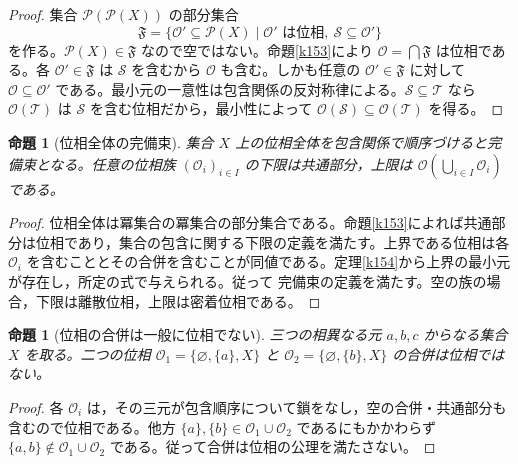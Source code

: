 \documentclass[a5paper,10pt,dvipdfmx]{jsarticle}
\theoremstyle{definition}
\theoremstyle{plain}
\newtheorem{prop}[ruledef]{命題}
\newcommand{\Pow}{\mathcal{P}}
\newcommand{\GenronRefText}[2]{#2}
\begin{document}
\begin{proof}
集合 $\Pow(\Pow(X))$ の部分集合
\[\mathfrak F=\{\mathcal{O}'\subseteq\Pow(X)\mid
 \mathcal{O}'\text{ は位相},\ \mathcal S\subseteq\mathcal{O}'\}\]
を作る。$\Pow(X)\in\mathfrak F$ なので空ではない。命題\ref{k153}により $\mathcal{O}=\bigcap\mathfrak F$ は位相である。各 $\mathcal{O}'\in\mathfrak F$ は $\mathcal S$ を含むから $\mathcal{O}$ も含む。しかも任意の $\mathcal{O}'\in\mathfrak F$ に対して $\mathcal{O}\subseteq\mathcal{O}'$ である。最小元の一意性は包含関係の反対称律による。$\mathcal S\subseteq\mathcal T$ なら $\mathcal{O}(\mathcal T)$ は $\mathcal S$ を含む位相だから，最小性によって $\mathcal{O}(\mathcal S)\subseteq\mathcal{O}(\mathcal T)$ を得る。
\end{proof}
\begin{prop}[位相全体の完備束]\label{k155}
集合 $X$ 上の位相全体を包含関係で順序づけると完備束となる。任意の位相族 $(\mathcal{O}_i)_{i\in I}$ の下限は共通部分，上限は $\mathcal{O}(\bigcup_{i\in I}\mathcal{O}_i)$ である。
\end{prop}
\begin{proof}
位相全体は冪集合の冪集合の部分集合である。命題\ref{k153}によれば共通部分は位相であり，集合の包含に関する下限の定義を満たす。上界である位相は各 $\mathcal{O}_i$ を含むこととその合併を含むことが同値である。定理\ref{k154}から上界の最小元が存在し，所定の式で与えられる。従って \GenronRefText{K-000085}{完備束の定義}を満たす。空の族の場合，下限は離散位相，上限は密着位相である。
\end{proof}
\begin{prop}[位相の合併は一般に位相でない]\label{k156}
三つの相異なる元 $a,b,c$ からなる集合 $X$ を取る。二つの位相 $\mathcal{O}_1=\{\varnothing,\{a\},X\}$ と $\mathcal{O}_2=\{\varnothing,\{b\},X\}$ の合併は位相ではない。
\end{prop}
\begin{proof}
各 $\mathcal{O}_i$ は，その三元が包含順序について鎖をなし，空の合併・共通部分も含むので位相である。他方 $\{a\},\{b\}\in\mathcal{O}_1\cup\mathcal{O}_2$ であるにもかかわらず $\{a,b\}\notin\mathcal{O}_1\cup\mathcal{O}_2$ である。従って合併は位相の公理を満たさない。
\end{proof}
\end{document}
